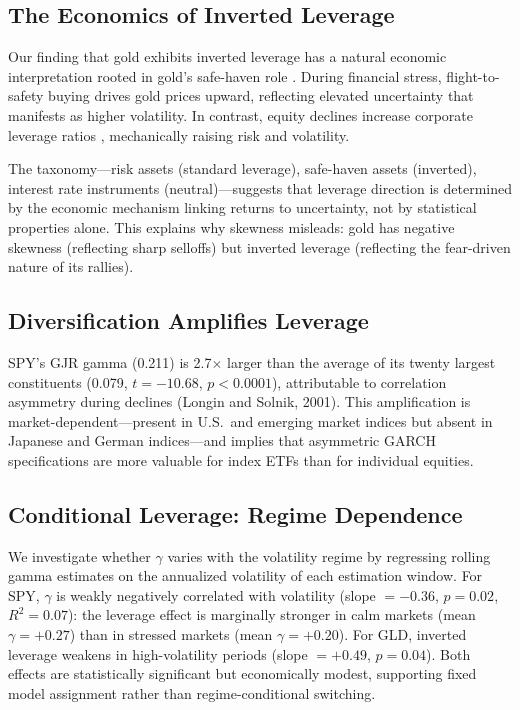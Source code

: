 \subsection{The Economics of Inverted Leverage}

Our finding that gold exhibits inverted leverage has a natural economic interpretation rooted in gold's safe-haven role \citep{baur2010safe}. During financial stress, flight-to-safety buying drives gold prices upward, reflecting elevated uncertainty that manifests as higher volatility. In contrast, equity declines increase corporate leverage ratios \citep{black1976}, mechanically raising risk and volatility.

The taxonomy---risk assets (standard leverage), safe-haven assets (inverted), interest rate instruments (neutral)---suggests that leverage direction is determined by the economic mechanism linking returns to uncertainty, not by statistical properties alone. This explains why skewness misleads: gold has negative skewness (reflecting sharp selloffs) but inverted leverage (reflecting the fear-driven nature of its rallies).

\subsection{Diversification Amplifies Leverage}

SPY's GJR gamma (0.211) is 2.7$\times$ larger than the average of its twenty largest constituents (0.079, $t = -10.68$, $p < 0.0001$), attributable to correlation asymmetry during declines (Longin and Solnik, 2001). This amplification is market-dependent---present in U.S.\ and emerging market indices but absent in Japanese and German indices---and implies that asymmetric GARCH specifications are more valuable for index ETFs than for individual equities.

\subsection{Conditional Leverage: Regime Dependence}

We investigate whether $\gamma$ varies with the volatility regime by regressing rolling gamma estimates on the annualized volatility of each estimation window. For SPY, $\gamma$ is weakly negatively correlated with volatility (slope $= -0.36$, $p = 0.02$, $R^2 = 0.07$): the leverage effect is marginally stronger in calm markets (mean $\gamma = +0.27$) than in stressed markets (mean $\gamma = +0.20$). For GLD, inverted leverage weakens in high-volatility periods (slope $= +0.49$, $p = 0.04$). Both effects are statistically significant but economically modest, supporting fixed model assignment rather than regime-conditional switching.

